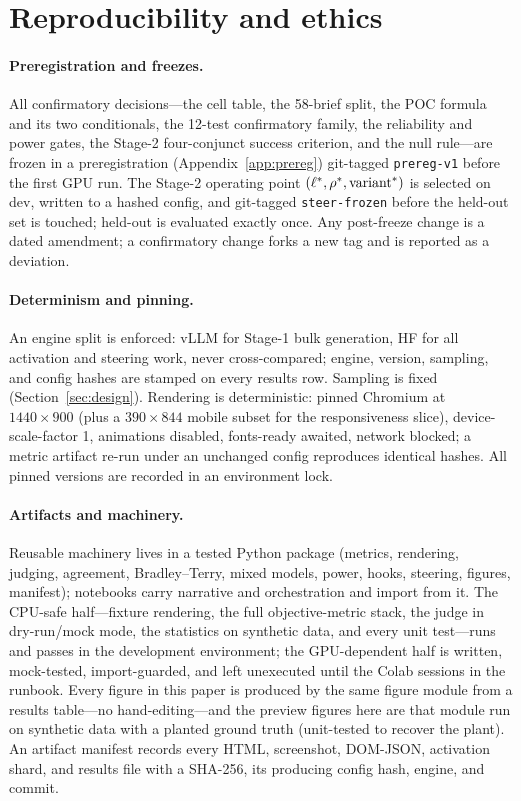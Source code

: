 \section{Reproducibility and ethics}
\label{sec:repro}

\paragraph{Preregistration and freezes.} All confirmatory decisions---the cell table, the 58-brief
split, the POC formula and its two conditionals, the 12-test confirmatory family, the reliability and
power gates, the Stage-2 four-conjunct success criterion, and the null rule---are frozen in a
preregistration (Appendix~\ref{app:prereg}) git-tagged \texttt{prereg-v1} before the first GPU run.
The Stage-2 operating point $(\ell^{*},\rho^{*},\text{variant}^{*})$ is selected on dev, written to a
hashed config, and git-tagged \texttt{steer-frozen} before the held-out set is touched; held-out is
evaluated exactly once. Any post-freeze change is a dated amendment; a confirmatory change forks a new
tag and is reported as a deviation.

\paragraph{Determinism and pinning.} An engine split is enforced: vLLM for Stage-1 bulk generation, HF
for all activation and steering work, never cross-compared; engine, version, sampling, and config
hashes are stamped on every results row. Sampling is fixed (Section~\ref{sec:design}). Rendering is
deterministic: pinned Chromium at $1440\times900$ (plus a $390\times844$ mobile subset for the
responsiveness slice), device-scale-factor 1, animations disabled, fonts-ready awaited,
network blocked; a metric artifact re-run under an unchanged config reproduces identical hashes. All
pinned versions are recorded in an environment lock.

\paragraph{Artifacts and machinery.} Reusable machinery lives in a tested Python package (metrics,
rendering, judging, agreement, Bradley--Terry, mixed models, power, hooks, steering, figures,
manifest); notebooks carry narrative and orchestration and import from it. The CPU-safe half---fixture
rendering, the full objective-metric stack, the judge in dry-run/mock mode, the statistics on
synthetic data, and every unit test---runs and passes in the development environment; the GPU-dependent
half is written, mock-tested, import-guarded, and left unexecuted until the Colab sessions in the
runbook. Every figure in this paper is produced by the same figure module from a results table---no
hand-editing---and the preview figures here are that module run on synthetic data with a planted ground
truth (unit-tested to recover the plant). An artifact manifest records every HTML, screenshot,
DOM-JSON, activation shard, and results file with a SHA-256, its producing config hash, engine, and
commit.


